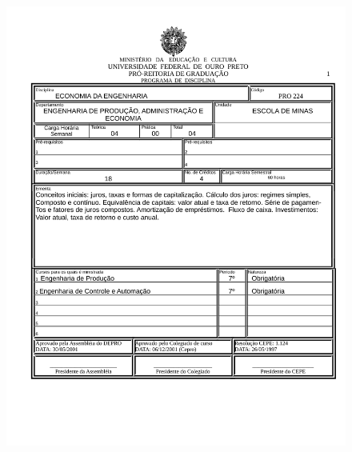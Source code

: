 \begin{figure}[p]
	\centering 
	\includegraphics[scale=0.7]{capitulos/anexo1-programas-disciplina/p104.pdf}
\end{figure}

